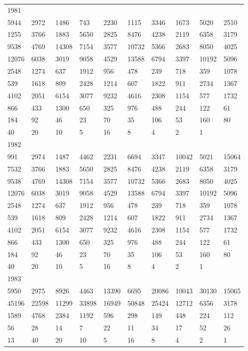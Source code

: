 \begin{longtable}{*{10}{l}}
1981&&&&&&&&&\\
5944& 2972& 1486& 743& 2230& 1115& 3346& 1673& 5020& 2510\\
1255& 3766& 1883& 5650& 2825& 8476& 4238& 2119& 6358& 3179\\
9538& 4769& 14308& 7154& 3577& 10732& 5366& 2683& 8050& 4025\\
12076& 6038& 3019& 9058& 4529& 13588& 6794& 3397& 10192& 5096\\
2548& 1274& 637& 1912& 956& 478& 239& 718& 359& 1078\\
539& 1618& 809& 2428& 1214& 607& 1822& 911& 2734& 1367\\
4102& 2051& 6154& 3077& 9232& 4616& 2308& 1154& 577& 1732\\
866& 433& 1300& 650& 325& 976& 488& 244& 122& 61\\
184& 92& 46& 23& 70& 35& 106& 53& 160& 80\\
40& 20& 10& 5& 16& 8& 4& 2& 1& \\

1982&&&&&&&&&\\
991& 2974& 1487& 4462& 2231& 6694& 3347& 10042& 5021& 15064\\
7532& 3766& 1883& 5650& 2825& 8476& 4238& 2119& 6358& 3179\\
9538& 4769& 14308& 7154& 3577& 10732& 5366& 2683& 8050& 4025\\
12076& 6038& 3019& 9058& 4529& 13588& 6794& 3397& 10192& 5096\\
2548& 1274& 637& 1912& 956& 478& 239& 718& 359& 1078\\
539& 1618& 809& 2428& 1214& 607& 1822& 911& 2734& 1367\\
4102& 2051& 6154& 3077& 9232& 4616& 2308& 1154& 577& 1732\\
866& 433& 1300& 650& 325& 976& 488& 244& 122& 61\\
184& 92& 46& 23& 70& 35& 106& 53& 160& 80\\
40& 20& 10& 5& 16& 8& 4& 2& 1& \\

1983&&&&&&&&&\\
5950& 2975& 8926& 4463& 13390& 6695& 20086& 10043& 30130& 15065\\
45196& 22598& 11299& 33898& 16949& 50848& 25424& 12712& 6356& 3178\\
1589& 4768& 2384& 1192& 596& 298& 149& 448& 224& 112\\
56& 28& 14& 7& 22& 11& 34& 17& 52& 26\\
13& 40& 20& 10& 5& 16& 8& 4& 2& 1\\


\end{longtable}
